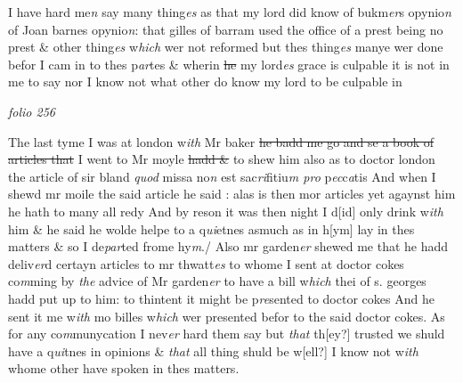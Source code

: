 \documentclass[12pt, a4paper]{book}
\begin{document}
			
				\marginpar[\vspace{0.5cm}{\textcolor{Gray}{n}}]{}
			
            		
				\marginpar[\vspace{0.5cm}{\textcolor{Gray}{6}}]{}
			
            		
		\ifthenelse{\isodd{\thepage}}
		{\reversemarginpar}
		{\normalmarginpar}
		I have hard me\textit{n} say many thing\textit{es} as that my lord did know of bukm\textit{er}s opynio\textit{n}
 of Joan barnes opynio\textit{n}: that gilles of barram used the office of a prest being no
prest \& other thing\textit{es} w\textit{hich} wer not reformed but thes thing\textit{es} manye wer done befor
I cam in to thes p\textit{ar}tes \& wherin \sout{he }my lord\textit{es} grace  is culpable it is not in 
            			me to say nor I know not what other do know my lord to be culpable in

\dotfill
						\newpage
{}

\textit{folio 256}


	
		
				\marginpar[\vspace{0.5cm}{\textcolor{Gray}{8}}]{}
			
 		
			
 		
		\ifthenelse{\isodd{\thepage}}
		{\reversemarginpar}
		{\normalmarginpar}
		The last tyme I was at london w\textit{ith} Mr baker \sout{he badd me go and se a book
of articles that}
 	I went to
			 Mr moyle \sout{hadd \&} to shew him also as to doctor london the
article of sir bland \textit{quod} missa no\textit{n} est sac\textit{ri}fitiu\textit{m pro} p\textit{ec}c\textit{a}tis And when I shewd
mr moile the said article he said : alas is then mor articles yet agaynst 
him he hath to many all redy And by reson it was then night I d[id]
only drink w\textit{ith} him \& he said he wolde helpe to a q\textit{ui}etnes asmuch as in h[ym]
lay in thes matters \& so I de\textit{par}ted frome hy\textit{m}./ Also mr garden\textit{er} shewed me that 
 he hadd deliv\textit{er}d certayn articles to mr thwatt\textit{es} to whome I sent at 
doctor cokes co\textit{m}ming by \textit{the} advice of Mr garden\textit{er} to have a bill w\textit{hich} thei of
s. georges hadd put up to him: to thintent it might be p\textit{re}sented to doctor
cokes And he sent it me w\textit{ith} mo billes w\textit{hich} wer presented befor to the said
doctor cokes. As for any co\textit{m}munycation I nev\textit{er} hard them say but \textit{that} th[ey?]
trusted we shuld have a q\textit{ui}tnes in opinions \& \textit{that} all thing shuld be w[ell?]
 		I know not w\textit{ith} whome other have spoken in thes matters.
	
\end{document}
